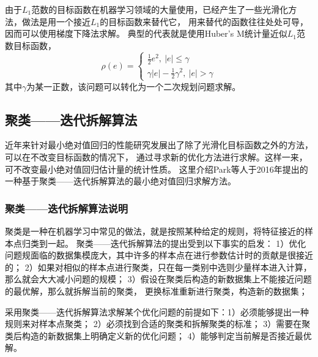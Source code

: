由于$L_1$范数的目标函数在机器学习领域的大量使用，已经产生了一些光滑化方法，做法是用一个接近$L_1$的目标函数来替代它，
用来替代的函数往往处处可导，因而可以使用梯度下降法求解。
典型的代表就是使用Huber’s M统计量近似$L_1$范数目标函数，
\begin{equation*}
    \rho(e) = \left\{
        \begin{array}{clr}
            \frac1{2}e^2,\ |e| \leq \gamma \\
            \gamma |e| - \frac1{2}\gamma ^2 ,\ |e| > \gamma
        \end{array}
    \right.
\end{equation*}
其中$\gamma$为某一正数，该问题可以转化为一个二次规划问题求解。


\subsection{聚类——迭代拆解算法}
近年来针对最小绝对值回归的性能研究发展出了除了光滑化目标函数之外的方法，可以在不改变目标函数的情况下，
通过寻求新的优化方法进行求解。这样一来，可不改变最小绝对值回归估计量的统计性质。
这里介绍Park等人于2016年提出的一种基于聚类——迭代拆解算法的最小绝对值回归求解方法。


\subsubsection{聚类——迭代拆解算法说明}
聚类是一种在机器学习中常见的做法，就是按照某种给定的规则，将特征接近的样本点归类到一起。
聚类——迭代拆解算法的提出受到以下事实的启发：
1）优化问题规面临的数据集模庞大，其中许多的样本点在进行参数估计时的贡献是很接近的；
2）如果对相似的样本点进行聚类，只在每一类别中选则少量样本进入计算，那么就会大大减小问题的规模；
3）假设在聚类后构造的新数据集上不能接近问题的最优解，那么就拆解当前的聚类，
更换标准重新进行聚类，构造新的数据集；

采用聚类——迭代拆解算法求解某个优化问题的前提如下：1）必须能够提出一种规则来对样本点聚类；
2）必须找到合适的聚类和拆解聚类的标准；
3）需要在聚类后构造的新数据集上明确定义新的优化问题；
4）能够判定当前解是否接近最优解。

